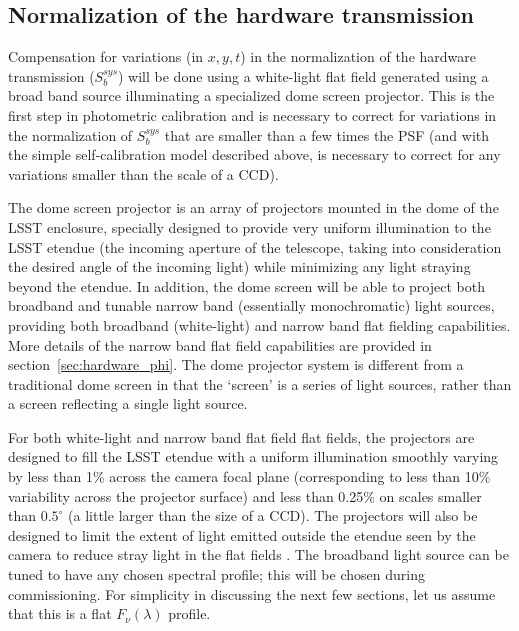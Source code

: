 \documentclass[12pt,preprint]{aastex}
\begin{document}
\subsection{Normalization of the hardware transmission}
\label{sec:hardware_norm}

Compensation for variations (in $x,y,t$) in the normalization of the
hardware transmission ($S_b^{sys}$) will be done using a white-light
flat field generated using a broad band source illuminating a
specialized dome screen projector. This is the first step in
photometric calibration and is necessary to correct for variations in
the normalization of $S_b^{sys}$ that are smaller than a few times the
PSF (and with the simple self-calibration model described above, is
necessary to correct for any variations smaller than the scale of a
CCD).

The dome screen projector is an array of projectors mounted in the
dome of the LSST enclosure, specially designed to provide very uniform
illumination to the LSST etendue (the incoming aperture of the
telescope, taking into consideration the desired angle of the incoming
light) while minimizing any light straying beyond the etendue. In
addition, the dome screen will be able to project both broadband and
tunable narrow band (essentially monochromatic) light sources,
providing both broadband (white-light) and narrow band flat fielding
capabilities.  More details of the narrow band flat field capabilities
are provided in section~\ref{sec:hardware_phi}. The dome projector
system is different from a traditional dome screen in that the
`screen' is a series of light sources, rather than a screen reflecting
a single light source.

For both white-light and narrow band flat field flat fields, the
projectors are designed to fill the LSST etendue with a uniform
illumination smoothly varying by less than 1\% across the camera focal
plane (corresponding to less than 10\% variability across the
projector surface) and less than 0.25\% on scales smaller than
$0.5^{\circ}$ (a little larger than the size of a CCD). The projectors
will also be designed to limit the extent of light emitted outside the
etendue seen by the camera to reduce stray light in the flat
fields \citep{Gressler2010}. The broadband light source can be tuned
to have any chosen spectral profile; this will be chosen during
commissioning. For simplicity in discussing the next few sections, let
us assume that this is a flat $F_\nu(\lambda)$ profile.
\end{document}
